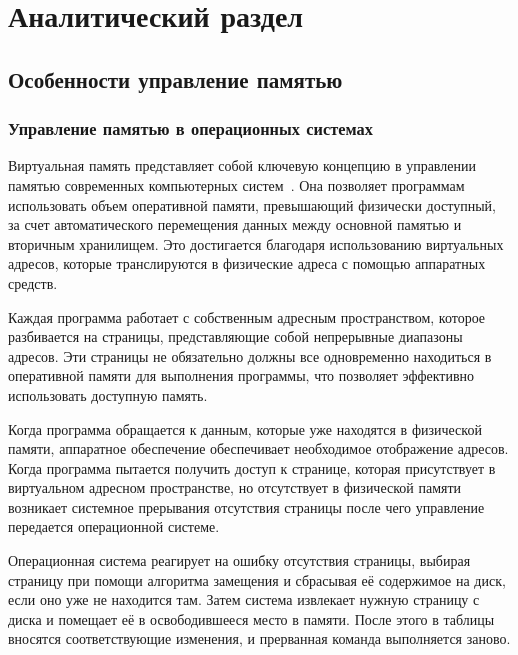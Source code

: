 \chapter{Аналитический раздел}

\section{Особенности управление памятью}

\subsection{Управление памятью в операционных системах}

Виртуальная память представляет собой ключевую концепцию в управлении памятью современных компьютерных систем~\cite{noor202512}.
Она позволяет программам использовать объем оперативной памяти, превышающий физически доступный, за счет автоматического перемещения данных между основной памятью
и вторичным хранилищем.
Это достигается благодаря использованию виртуальных адресов, которые транслируются в физические адреса с помощью аппаратных средств.

Каждая программа работает с собственным адресным пространством, которое разбивается на страницы, представляющие собой непрерывные диапазоны адресов.
Эти страницы не обязательно должны все одновременно находиться в оперативной памяти для выполнения программы, что позволяет эффективно использовать доступную память.

Когда программа обращается к данным, которые уже находятся в физической памяти, аппаратное обеспечение обеспечивает необходимое отображение адресов.
Когда программа пытается получить доступ к странице, которая присутствует в виртуальном адресном пространстве, но отсутствует в физической памяти возникает системное прерывания отсутствия страницы после чего управление передается операционной системе.

Операционная система реагирует на ошибку отсутствия страницы, выбирая страницу при помощи алгоритма замещения и сбрасывая её содержимое на диск, если оно уже не находится там. 
Затем система извлекает нужную страницу с диска и помещает её в освободившееся место в памяти. 
После этого в таблицы вносятся соответствующие изменения, и прерванная команда выполняется заново.

